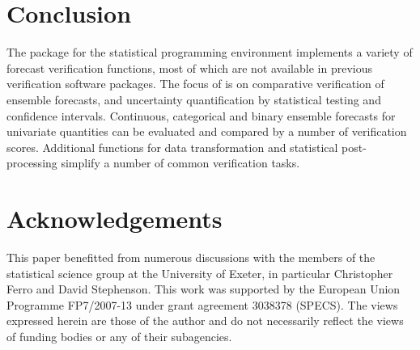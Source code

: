 \documentclass[article]{jss}\usepackage[]{graphicx}\usepackage[]{color}
\begin{document}
\section{Conclusion}

The package  for the  statistical programming environment implements a variety of forecast verification functions, most of which are not available in previous verification software packages.
The focus of  is on comparative verification of ensemble forecasts, and uncertainty quantification by statistical testing and confidence intervals.
Continuous, categorical and binary ensemble forecasts for univariate quantities can be evaluated and compared by a number of verification scores.
Additional functions for data transformation and statistical post-processing simplify a number of common verification tasks.


\section*{Acknowledgements}

This paper benefitted from numerous discussions with the members of the statistical science group at the University of Exeter, in particular Christopher Ferro and David Stephenson.
This work was supported by the European Union Programme FP7/2007-13 under grant agreement 3038378 (SPECS).
The views expressed herein are those of the author and do not necessarily reflect the views of funding bodies or any of their subagencies.



\end{document}
